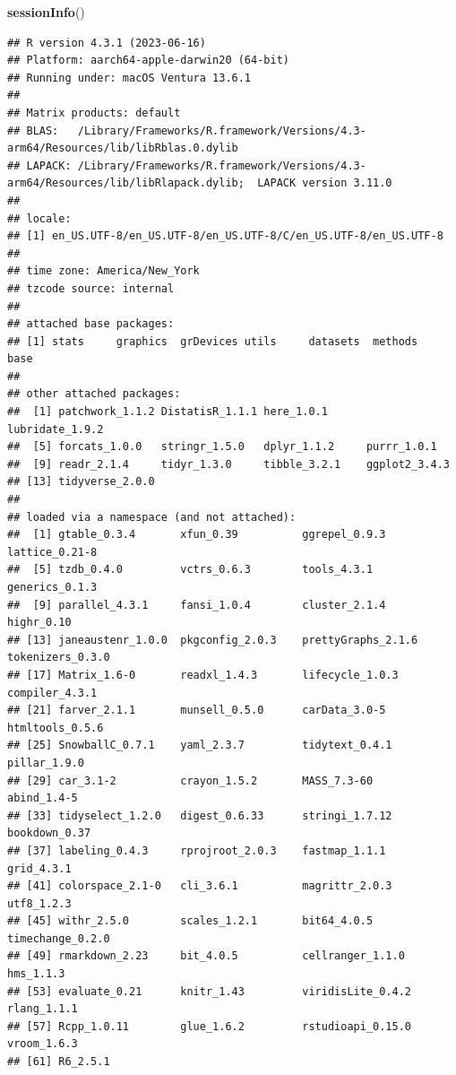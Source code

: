 \documentclass[
]{book}
\newenvironment{Shaded}{\begin{snugshade}}{\end{snugshade}}
\newcommand{\FunctionTok}[1]{\textcolor[rgb]{0.13,0.29,0.53}{\textbf{#1}}}
\newcommand{\NormalTok}[1]{#1}
\begin{document}
\begin{Shaded}
\begin{Highlighting}[]
\FunctionTok{sessionInfo}\NormalTok{()}
\end{Highlighting}
\end{Shaded}

\begin{verbatim}
## R version 4.3.1 (2023-06-16)
## Platform: aarch64-apple-darwin20 (64-bit)
## Running under: macOS Ventura 13.6.1
## 
## Matrix products: default
## BLAS:   /Library/Frameworks/R.framework/Versions/4.3-arm64/Resources/lib/libRblas.0.dylib 
## LAPACK: /Library/Frameworks/R.framework/Versions/4.3-arm64/Resources/lib/libRlapack.dylib;  LAPACK version 3.11.0
## 
## locale:
## [1] en_US.UTF-8/en_US.UTF-8/en_US.UTF-8/C/en_US.UTF-8/en_US.UTF-8
## 
## time zone: America/New_York
## tzcode source: internal
## 
## attached base packages:
## [1] stats     graphics  grDevices utils     datasets  methods   base     
## 
## other attached packages:
##  [1] patchwork_1.1.2 DistatisR_1.1.1 here_1.0.1      lubridate_1.9.2
##  [5] forcats_1.0.0   stringr_1.5.0   dplyr_1.1.2     purrr_1.0.1    
##  [9] readr_2.1.4     tidyr_1.3.0     tibble_3.2.1    ggplot2_3.4.3  
## [13] tidyverse_2.0.0
## 
## loaded via a namespace (and not attached):
##  [1] gtable_0.3.4       xfun_0.39          ggrepel_0.9.3      lattice_0.21-8    
##  [5] tzdb_0.4.0         vctrs_0.6.3        tools_4.3.1        generics_0.1.3    
##  [9] parallel_4.3.1     fansi_1.0.4        cluster_2.1.4      highr_0.10        
## [13] janeaustenr_1.0.0  pkgconfig_2.0.3    prettyGraphs_2.1.6 tokenizers_0.3.0  
## [17] Matrix_1.6-0       readxl_1.4.3       lifecycle_1.0.3    compiler_4.3.1    
## [21] farver_2.1.1       munsell_0.5.0      carData_3.0-5      htmltools_0.5.6   
## [25] SnowballC_0.7.1    yaml_2.3.7         tidytext_0.4.1     pillar_1.9.0      
## [29] car_3.1-2          crayon_1.5.2       MASS_7.3-60        abind_1.4-5       
## [33] tidyselect_1.2.0   digest_0.6.33      stringi_1.7.12     bookdown_0.37     
## [37] labeling_0.4.3     rprojroot_2.0.3    fastmap_1.1.1      grid_4.3.1        
## [41] colorspace_2.1-0   cli_3.6.1          magrittr_2.0.3     utf8_1.2.3        
## [45] withr_2.5.0        scales_1.2.1       bit64_4.0.5        timechange_0.2.0  
## [49] rmarkdown_2.23     bit_4.0.5          cellranger_1.1.0   hms_1.1.3         
## [53] evaluate_0.21      knitr_1.43         viridisLite_0.4.2  rlang_1.1.1       
## [57] Rcpp_1.0.11        glue_1.6.2         rstudioapi_0.15.0  vroom_1.6.3       
## [61] R6_2.5.1
\end{verbatim}
\end{document}
